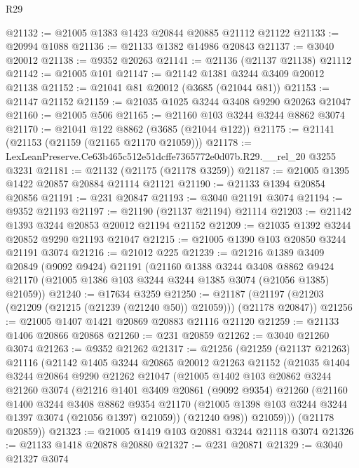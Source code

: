 \begin{lexlean}{R29}
\begin{coremodule}
@21132 := @21005 @1383 @1423 @20844 @20885 @21112 @21122
@21133 := @20994 @1088
@21136 := @21133 @1382 @14986 @20843
@21137 := @3040 @20012
@21138 := @9352 @20263
@21141 := @21136 (@21137 @21138) @21112
@21142 := @21005 @101
@21147 := @21142 @1381 @3244 @3409 @20012 @21138
@21152 := @21041 @81 @20012 (@3685 (@21044 @81))
@21153 := @21147 @21152
@21159 := @21035 @1025 @3244 @3408 @9290 @20263 @21047
@21160 := @21005 @506
@21165 := @21160 @103 @3244 @3244 @8862 @3074
@21170 := @21041 @122 @8862 (@3685 (@21044 @122))
@21175 := @21141 (@21153 (@21159 (@21165 @21170 @21059)))
@21178 := LexLeanPreserve.Ce63b465c512e51dcffe7365772e0d07b.R29.__rel_20 @3255 @3231
@21181 := @21132 (@21175 (@21178 @3259))
@21187 := @21005 @1395 @1422 @20857 @20884 @21114 @21121
@21190 := @21133 @1394 @20854 @20856
@21191 := @231 @20847
@21193 := @3040 @21191 @3074
@21194 := @9352 @21193
@21197 := @21190 (@21137 @21194) @21114
@21203 := @21142 @1393 @3244 @20853 @20012 @21194 @21152
@21209 := @21035 @1392 @3244 @20852 @9290 @21193 @21047
@21215 := @21005 @1390 @103 @20850 @3244 @21191 @3074
@21216 := @21012 @225
@21239 := @21216
    @1389
    @3409
    @20849
    (@9092 @9424)
    @21191
    (@21160
      @1388
      @3244
      @3408
      @8862
      @9424
      @21170
      (@21005 @1386 @103 @3244 @3244 @1385 @3074 (@21056 @1385) @21059))
@21240 := @17634 @3259
@21250 := @21187 (@21197 (@21203 (@21209 (@21215 (@21239 (@21240 @50)) @21059))) (@21178 @20847))
@21256 := @21005 @1407 @1421 @20869 @20883 @21116 @21120
@21259 := @21133 @1406 @20866 @20868
@21260 := @231 @20859
@21262 := @3040 @21260 @3074
@21263 := @9352 @21262
@21317 := @21256
    (@21259
      (@21137 @21263)
      @21116
      (@21142
        @1405
        @3244
        @20865
        @20012
        @21263
        @21152
        (@21035
          @1404
          @3244
          @20864
          @9290
          @21262
          @21047
          (@21005
            @1402
            @103
            @20862
            @3244
            @21260
            @3074
            (@21216
              @1401
              @3409
              @20861
              (@9092 @9354)
              @21260
              (@21160
                @1400
                @3244
                @3408
                @8862
                @9354
                @21170
                (@21005 @1398 @103 @3244 @3244 @1397 @3074 (@21056 @1397) @21059))
              (@21240 @98))
            @21059)))
      (@21178 @20859))
@21323 := @21005 @1419 @103 @20881 @3244 @21118 @3074
@21326 := @21133 @1418 @20878 @20880
@21327 := @231 @20871
@21329 := @3040 @21327 @3074

\end{coremodule}
\end{lexlean}

